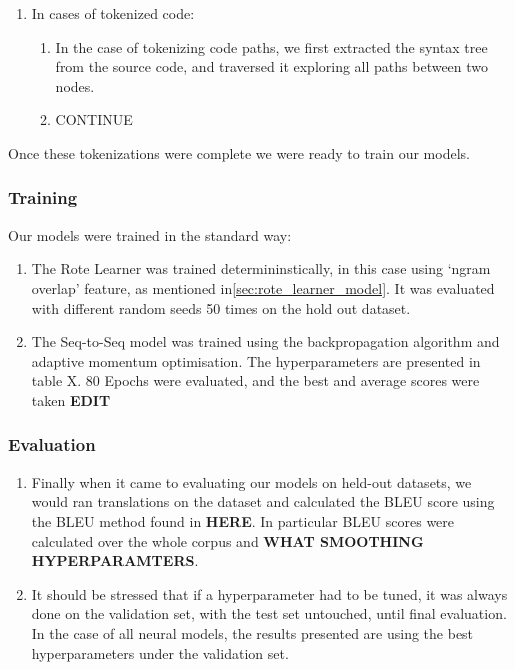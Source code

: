 \begin{enumerate}
\begin{enumerate}
    \end{enumerate}



    \item In cases of tokenized code: 
     \begin{enumerate}
         \item  In the case of tokenizing code paths, we first extracted the syntax tree from the source code, and traversed it exploring all paths between two nodes.
         \item CONTINUE
     \end{enumerate}

\end{enumerate}

Once these tokenizations were complete we were ready to train our models.

\subsubsection{Training} %
\label{ssub:training}


    Our models were trained in the standard way:
    \begin{enumerate}
        \item The Rote Learner was trained determininstically, in this case using `ngram overlap' feature, as mentioned in\ref{sec:rote_learner_model}. It was evaluated with different random seeds 50 times on the hold out dataset.
        \item The Seq-to-Seq model was trained using the backpropagation algorithm and adaptive momentum optimisation. The hyperparameters are presented in table X. 80 Epochs were evaluated, and the best and average scores were taken \textbf{EDIT}
    \end{enumerate}

\subsubsection{Evaluation} %
\label{ssub:evaluation}

\begin{enumerate}



    \item Finally when it came to evaluating our models on held-out datasets, we would ran translations on the dataset and calculated the BLEU score using the BLEU method found in \textbf{HERE}.
    In particular BLEU scores were calculated over the whole corpus and \textbf{WHAT SMOOTHING HYPERPARAMTERS}.
    \item It should be stressed that if a hyperparameter had to be tuned, it was always done on the validation set, with the test set untouched, until final evaluation. In the case of all neural models, the results presented are using the best hyperparameters under the validation set.

\end{enumerate}

